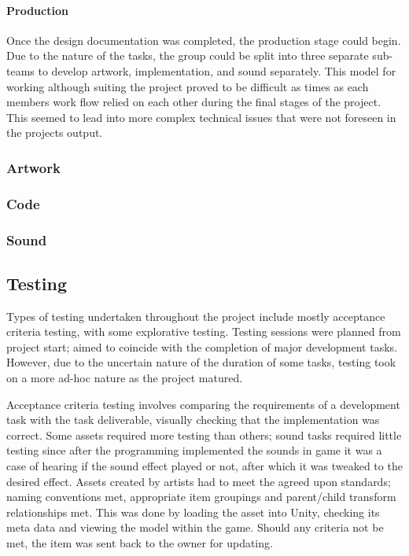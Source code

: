 \documentclass[12pt]{article}
\begin{document}
\paragraph{Production}

Once the design documentation was completed, the production stage could begin. Due to the nature of the tasks, the group could be split into three separate sub-teams to develop artwork, implementation, and sound separately. This model for working although suiting the project proved to be difficult as times as each members work flow relied on each other during the final stages of the project. This seemed to lead into more complex technical issues that were not foreseen in the projects output.

\subsubsection{Artwork}

\subsubsection{Code}

\subsubsection{Sound}

\subsection{Testing}
Types of testing undertaken throughout the project include mostly acceptance criteria testing, with some explorative testing. Testing sessions were planned from project start; aimed to coincide with the completion of major development tasks. However, due to the uncertain nature of the duration of some tasks, testing took on a more ad-hoc nature as the project matured. 

Acceptance criteria testing involves comparing the requirements of a development task with the task deliverable, visually checking that the implementation was correct. Some assets required more testing than others; sound tasks required little testing since after the programming implemented the sounds in game it was a case of hearing if the sound effect played or not, after which it was tweaked to the desired effect. Assets created by artists had to meet the agreed upon standards; naming conventions met, appropriate item groupings and parent/child transform relationships met. This was done by loading the asset into Unity, checking its meta data and viewing the model within the game. Should any criteria not be met, the item was sent back to the owner for updating. 
\end{document}
